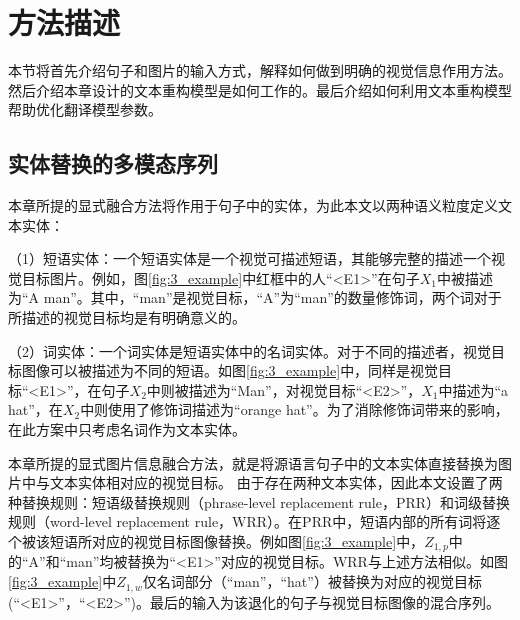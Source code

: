 \section{方法描述}

本节将首先介绍句子和图片的输入方式，解释如何做到明确的视觉信息作用方法。然后介绍本章设计的文本重构模型是如何工作的。最后介绍如何利用文本重构模型帮助优化翻译模型参数。

\subsection{实体替换的多模态序列}
\label{sec:3_entity_replacement}


本章所提的显式融合方法将作用于句子中的实体，为此本文以两种语义粒度定义文本实体：

（1）{\sffamily 短语实体：}一个短语实体是一个视觉可描述短语，其能够完整的描述一个视觉目标图片。例如，图\ref{fig:3_example}中红框中的人“<E1>”在句子$X_1$中被描述为“A man”。其中，“man”是视觉目标，“A”为“man”的数量修饰词，两个词对于所描述的视觉目标均是有明确意义的。

（2）{\sffamily 词实体：}一个词实体是短语实体中的名词实体。对于不同的描述者，视觉目标图像可以被描述为不同的短语。如图\ref{fig:3_example}中，同样是视觉目标“<E1>”，在句子$X_2$中则被描述为“Man”，对视觉目标“<E2>”，$X_1$中描述为“a hat”，在$X_2$中则使用了修饰词描述为“orange hat”。为了消除修饰词带来的影响，在此方案中只考虑名词作为文本实体。

本章所提的显式图片信息融合方法，就是将源语言句子中的文本实体直接替换为图片中与文本实体相对应的视觉目标。
由于存在两种文本实体，因此本文设置了两种替换规则：短语级替换规则（phrase-level replacement rule，PRR）和词级替换规则（word-level replacement rule，WRR）。在PRR中，短语内部的所有词将逐个被该短语所对应的视觉目标图像替换。例如图\ref{fig:3_example}中，$Z_{1,p}$中的“A”和“man”均被替换为“<E1>”对应的视觉目标。WRR与上述方法相似。如图\ref{fig:3_example}中$Z_{1,w}$仅名词部分（“man”，“hat”）被替换为对应的视觉目标(“<E1>”，“<E2>”)。最后的输入为该退化的句子与视觉目标图像的混合序列。

